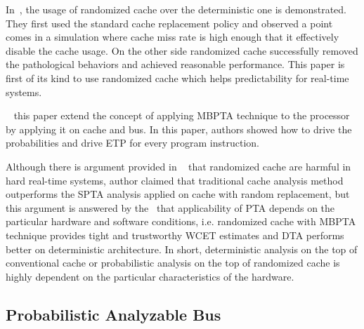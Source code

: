 In~\cite{quinones2009using}, the usage of randomized cache over the deterministic one is demonstrated. They first used the standard cache replacement policy and observed a point comes in a simulation where cache miss rate is high enough that it effectively disable the cache usage. On the other side randomized cache successfully removed the pathological behaviors and achieved reasonable performance. This paper is first of its kind to use randomized cache which helps predictability for real-time systems. 

~\cite{kosmidis2014measurement} this paper extend the concept of applying MBPTA technique to the processor by applying it on cache and  bus. In this paper, authors showed how to drive the probabilities and drive ETP for every program instruction. 


 Although there is argument provided in ~\cite{reineke2014randomized} that randomized cache are harmful in hard real-time systems, author claimed that traditional cache analysis method outperforms the SPTA analysis applied on cache with random replacement, but this argument is answered by the~\cite{mezzetti2015randomized} that applicability of PTA depends on the particular hardware and software conditions, i.e. randomized cache with MBPTA technique  provides tight and trustworthy WCET estimates and DTA performs better on deterministic architecture. In short, deterministic analysis on the top of conventional cache or probabilistic analysis on the top of randomized cache is highly dependent on the particular characteristics of the hardware.  



\subsection{Probabilistic Analyzable Bus} 



